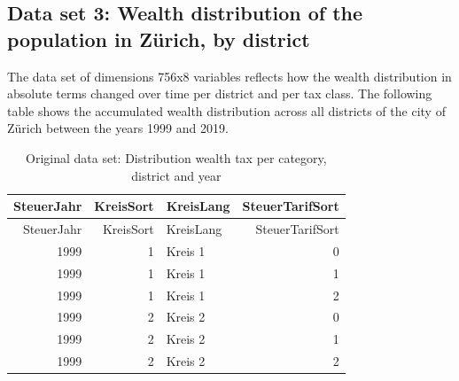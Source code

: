 \documentclass[
]{article}
\begin{document}
\pagebreak

\hypertarget{data-set-3-wealth-distribution-of-the-population-in-zuxfcrich-by-district}{%
\subsection{Data set 3: Wealth distribution of the population in Zürich,
by
district}\label{data-set-3-wealth-distribution-of-the-population-in-zuxfcrich-by-district}}

The data set of dimensions 756x8 variables reflects how the wealth
distribution in absolute terms changed over time per district and per
tax class. The following table shows the accumulated wealth distribution
across all districts of the city of Zürich between the years 1999 and
2019.

\begin{longtable}[]{@{}rrlr@{}}
\caption{Original data set: Distribution wealth tax per category,
district and year}\tabularnewline
\toprule
SteuerJahr & KreisSort & KreisLang & SteuerTarifSort\tabularnewline
\midrule
\endfirsthead
\toprule
SteuerJahr & KreisSort & KreisLang & SteuerTarifSort\tabularnewline
\midrule
\endhead
1999 & 1 & Kreis 1 & 0\tabularnewline
1999 & 1 & Kreis 1 & 1\tabularnewline
1999 & 1 & Kreis 1 & 2\tabularnewline
1999 & 2 & Kreis 2 & 0\tabularnewline
1999 & 2 & Kreis 2 & 1\tabularnewline
1999 & 2 & Kreis 2 & 2\tabularnewline
\bottomrule
\end{longtable}
\end{document}
